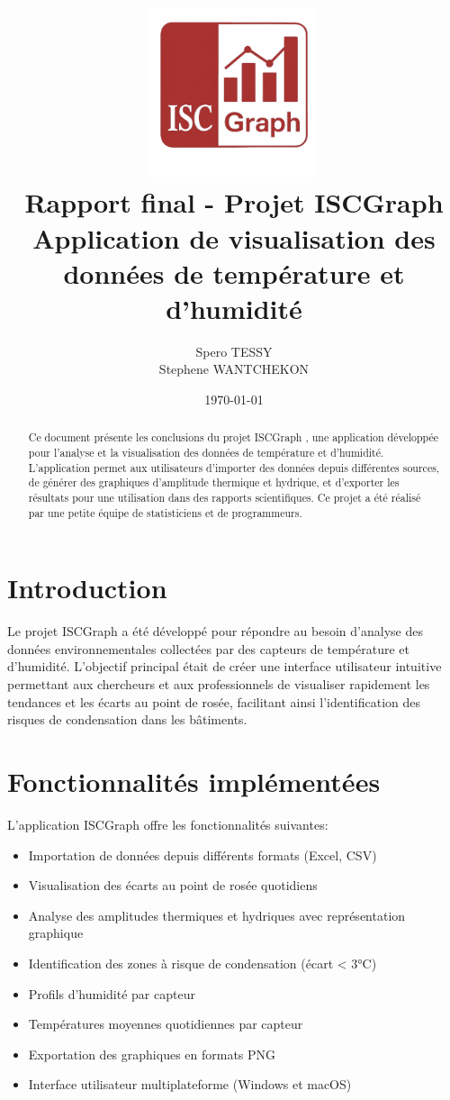 \documentclass[a4paper,11pt]{article}
\title{
    \includegraphics[width=5cm]{../ui/assets/img/logo.png}\\[1cm]
    \textbf{Rapport final - Projet ISCGraph }\\
    \large{Application de visualisation des données de température et d'humidité}
}
\author{Spero TESSY \\ Stephene WANTCHEKON }
\date{\today}
\begin{document}
\maketitle

\begin{abstract}
Ce document présente les conclusions du projet ISCGraph , une application développée pour l'analyse et la visualisation des données de température et d'humidité. L'application permet aux utilisateurs d'importer des données depuis différentes sources, de générer des graphiques d'amplitude thermique et hydrique, et d'exporter les résultats pour une utilisation dans des rapports scientifiques. Ce projet a été réalisé par une petite équipe de statisticiens et de programmeurs.
\end{abstract}

\section{Introduction}

Le projet ISCGraph  a été développé pour répondre au besoin d'analyse des données environnementales collectées par des capteurs de température et d'humidité. L'objectif principal était de créer une interface utilisateur intuitive permettant aux chercheurs et aux professionnels de visualiser rapidement les tendances et les écarts au point de rosée, facilitant ainsi l'identification des risques de condensation dans les bâtiments.

\section{Fonctionnalités implémentées}

L'application ISCGraph  offre les fonctionnalités suivantes:

\begin{itemize}
    \item Importation de données depuis différents formats (Excel, CSV)
    \item Visualisation des écarts au point de rosée quotidiens
    \item Analyse des amplitudes thermiques et hydriques avec représentation graphique
    \item Identification des zones à risque de condensation (écart < 3°C)
    \item Profils d'humidité par capteur
    \item Températures moyennes quotidiennes par capteur
    \item Exportation des graphiques en formats PNG
    \item Interface utilisateur multiplateforme (Windows et macOS)
\end{itemize}
\end{document}

